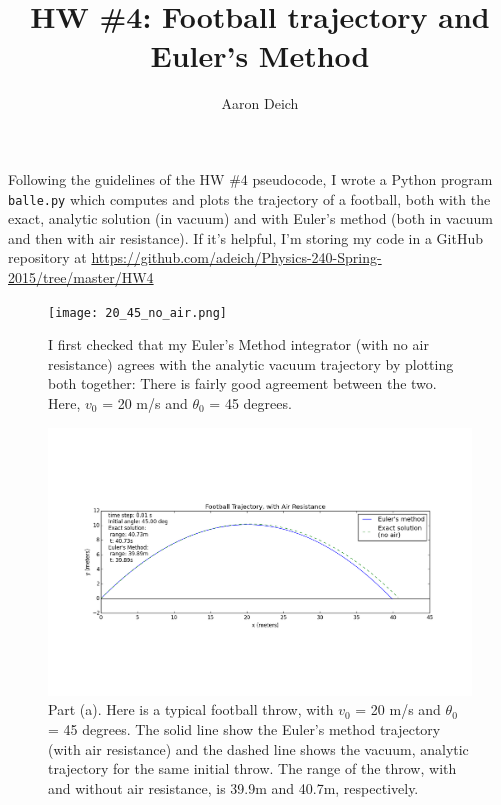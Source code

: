 \documentclass{article}
\begin{document}
\title{HW \#4: Football trajectory and Euler's Method}
\author{Aaron Deich}

\maketitle

Following the guidelines of the HW \#4 pseudocode, I wrote a Python program \texttt{balle.py} which computes and plots the trajectory of a football, both with the exact, analytic solution (in vacuum) and with Euler's method (both in vacuum and then with air resistance). If it's helpful, I'm storing my code in a GitHub repository at \url{https://github.com/adeich/Physics-240-Spring-2015/tree/master/HW4}



\begin{figure}[h!]
   \centering
    \texttt{[image: 20\_45\_no\_air.png]}
     \caption{I first checked that my Euler's Method integrator (with no air resistance) agrees with the analytic vacuum trajectory by plotting both together: There is fairly good agreement between the two. Here, $v_0$ = 20 m/s and $\theta_0$ = 45 degrees.}

\end{figure}



\begin{figure}[h!]  
  \centering
    \includegraphics[width=1.1\textwidth]{20_45_yes_air.png}
    \caption{Part (a). Here is a typical football throw, with $v_0$ = 20 m/s and $\theta_0$ = 45 degrees. The solid line show the Euler's method trajectory (with air resistance) and the dashed line shows the vacuum, analytic trajectory for the same initial throw. The range of the throw, with and without air resistance, is 39.9m and 40.7m, respectively.}
\end{figure}
\end{document}
